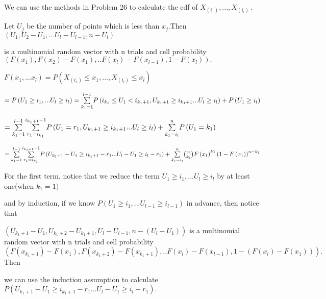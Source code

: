 \documentclass{article}
\begin{document}
We can use the methods in Problem 26 to calculate the cdf of $X_{\left(
i_{1}\right) },...,X_{\left( i_{l}\right) \ }.$

Let $U_{j}$ be the number of points which is less than $x_{j}.$Then $\left(
U_{1},U_{2}-U_{1},...U_{l}-U_{l-1},n-U_{l}\right) $

is a multinomial random vector with n trials and cell probability $\left(
F\left( x_{1}\right) ,F\left( x_{2}\right) -F\left( x_{1}\right) ,..F\left(
x_{l}\right) -F\left( x_{l-1}\right) ,1-F\left( x_{l}\right) \right) .$

$F\left( x_{1},...x_{l}\right) =P\left( X_{\left( i_{1}\right) }\leq
x_{1},...,X_{\left( i_{l}\right) }\leq x_{l}\right) $

$=P\left( U_{1}\geq i_{1},...U_{l}\geq i_{l}\right) =\overset{l-1}{\underset{%
k_{1}=1}{\sum }}P\left( i_{k_{1}}\leq U_{1}<i_{k_{1}+1},U_{k_{1}+1}\geq
i_{k_{1}+1}...U_{l}\geq i_{l}\right) +P\left( U_{1}\geq i_{l}\right) $

$=\overset{l-1}{\underset{k_{1}=1}{\sum }}\overset{i_{k_{1}+1}-1}{\underset{%
r_{1}=i_{k_{1}}}{\sum }}P\left( U_{1}=r_{1},U_{k_{1}+1}\geq
i_{k_{1}+1}...U_{l}\geq i_{l}\right) +\overset{n}{\underset{k_{1}=i_{l}}{%
\sum }}P\left( U_{1}=k_{1}\right) $

$=\overset{l-1}{\underset{k_{1}=1}{\sum }}\overset{i_{k_{1}+1}-1}{\underset{%
r_{1}=i_{k_{1}}}{\sum }}P\left( U_{k_{1}+1}-U_{1}\geq
i_{k_{1}+1}-r_{1}...U_{l}-U_{1}\geq i_{l}-r_{1}\right) +\overset{n}{\underset%
{k_{1}=i_{l}}{\sum }}\binom{n}{k_{1}}F\left( x_{1}\right) ^{k1}\left(
1-F\left( x_{1}\right) \right) ^{n-k_{1}}$

\bigskip 

For the first term, notice that we reduce the term $U_{1}\geq
i_{1},...U_{l}\geq i_{l}$ by at least one(when $k_{1}=1)$

and by induction, if we know $P\left( U_{1}\geq i_{1},...U_{l-1}\geq
i_{l-1}\right) $ in advance, then notice that 

$\left( U_{k_{1}+1}-U_{1},U_{k_{1}+2}-U_{k_{1}+1},U_{l}-U_{l-1},n-\left(
U_{l}-U_{1}\right) \right) $ is a multinomial random vector with n trials
and cell probability $\left( F\left( x_{k_{1}+1}\right) -F\left(
x_{1}\right) ,F\left( x_{k_{1}+2}\right) -F\left( x_{k_{1}+1}\right)
,..F\left( x_{l}\right) -F\left( x_{l-1}\right) ,1-\left( F\left(
x_{l}\right) -F\left( x_{1}\right) \right) \right) .$Then

we can use the induction assumption to calculate $P\left(
U_{k_{1}+1}-U_{1}\geq i_{k_{1}+1}-r_{1}...U_{l}-U_{1}\geq i_{l}-r_{1}\right)
.$
\end{document}
